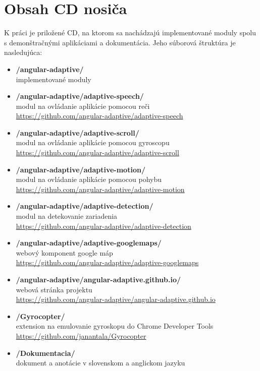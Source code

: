 \section{Obsah CD nosiča} %
\label{sec:obsah_cd_nosi_a}
K práci je priložené CD, na ktorom sa nachádzajú implementované moduly spolu s demonštračnými aplikáciami a dokumentácia. Jeho súborová štruktúra je nasledujúca:

\begin{itemize}
  \item \textbf{/angular-adaptive/}\\
    implementované moduly
  \item \textbf{/angular-adaptive/adaptive-speech/}\\
    modul na ovládanie aplikácie pomocou reči\\
    \url{https://github.com/angular-adaptive/adaptive-speech}
  \item \textbf{/angular-adaptive/adaptive-scroll/}\\
    modul na ovládanie aplikácie pomocou gyroscopu\\
    \url{https://github.com/angular-adaptive/adaptive-scroll}
  \item \textbf{/angular-adaptive/adaptive-motion/}\\
    modul na ovládanie aplikácie pomocou pohybu\\
    \url{https://github.com/angular-adaptive/adaptive-motion}
  \item \textbf{/angular-adaptive/adaptive-detection/}\\
    modul na detekovanie zariadenia\\
    \url{https://github.com/angular-adaptive/adaptive-detection}
  \item \textbf{/angular-adaptive/adaptive-googlemaps/}\\
    webový komponent google máp\\
    \url{https://github.com/angular-adaptive/adaptive-googlemaps}
  \item \textbf{/angular-adaptive/angular-adaptive.github.io/}\\
    webová stránka projektu\\
    \url{https://github.com/angular-adaptive/angular-adaptive.github.io}

  \item \textbf{/Gyrocopter/}\\
    extension na emulovanie gyroskopu do Chrome Developer Tools\\
    \url{https://github.com/janantala/Gyrocopter}

  \item \textbf{/Dokumentacia/}\\
    dokument a anotácie v slovenskom a anglickom jazyku
\end{itemize}

